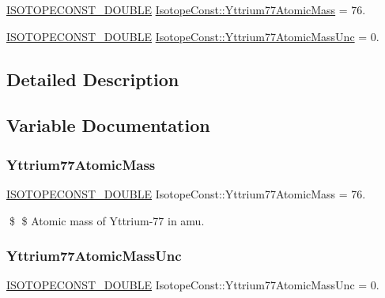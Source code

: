 \begin{DoxyCompactItemize}
\item 
\mbox{\hyperlink{group___isotope_const-_macros_ga8f45a7272ce02c0b4c65c44636ed719a}{I\+S\+O\+T\+O\+P\+E\+C\+O\+N\+S\+T\+\_\+\+D\+O\+U\+B\+LE}} \mbox{\hyperlink{group___isotope_const-_yttrium-_y77_ga14527c5d48da31c4e439b8d2c930ecf5}{Isotope\+Const\+::\+Yttrium77\+Atomic\+Mass}} = 76.
\item 
\mbox{\hyperlink{group___isotope_const-_macros_ga8f45a7272ce02c0b4c65c44636ed719a}{I\+S\+O\+T\+O\+P\+E\+C\+O\+N\+S\+T\+\_\+\+D\+O\+U\+B\+LE}} \mbox{\hyperlink{group___isotope_const-_yttrium-_y77_gaddbeb42da6b2a6c7f905592ccbe15548}{Isotope\+Const\+::\+Yttrium77\+Atomic\+Mass\+Unc}} = 0.
\end{DoxyCompactItemize}


\subsection{Detailed Description}


\subsection{Variable Documentation}
\mbox{\label{group___isotope_const-_yttrium-_y77_ga14527c5d48da31c4e439b8d2c930ecf5}} 
\subsubsection{\texorpdfstring{Yttrium77\+Atomic\+Mass}{Yttrium77AtomicMass}}
{\footnotesize\ttfamily \mbox{\hyperlink{group___isotope_const-_macros_ga8f45a7272ce02c0b4c65c44636ed719a}{I\+S\+O\+T\+O\+P\+E\+C\+O\+N\+S\+T\+\_\+\+D\+O\+U\+B\+LE}} Isotope\+Const\+::\+Yttrium77\+Atomic\+Mass = 76.}

\$ \$ Atomic mass of Yttrium-\/77 in amu. \mbox{\label{group___isotope_const-_yttrium-_y77_gaddbeb42da6b2a6c7f905592ccbe15548}} 
\subsubsection{\texorpdfstring{Yttrium77\+Atomic\+Mass\+Unc}{Yttrium77AtomicMassUnc}}
{\footnotesize\ttfamily \mbox{\hyperlink{group___isotope_const-_macros_ga8f45a7272ce02c0b4c65c44636ed719a}{I\+S\+O\+T\+O\+P\+E\+C\+O\+N\+S\+T\+\_\+\+D\+O\+U\+B\+LE}} Isotope\+Const\+::\+Yttrium77\+Atomic\+Mass\+Unc = 0.}


